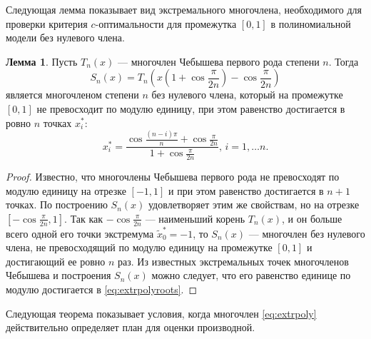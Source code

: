 \documentclass[specialist,
               substylefile = spbu.rtx,
               subf,href,colorlinks=true, 12pt]{disser}
\theoremstyle{definition}
\newtheorem{lemma}{Лемма}
\begin{document}
  Следующая лемма показывает вид экстремального многочлена, необходимого для проверки критерия $c$-оптимальности для промежутка $[0, 1]$ в полиномиальной модели без нулевого члена.
  
  \begin{lemma}
  \label{lemma:extrpoly}
  Пусть $T_n(x)$ --- многочлен Чебышева первого рода степени $n$. Тогда 
  	\begin{equation}
  	\label{eq:extrpoly}
  		S_n(x) = T_n \left(x \left(1 + \cos \frac{\pi}{2n} \right) - \cos \frac{\pi}{2n} \right)
	\end{equation}   
	является многочленом степени $n$ без нулевого члена, который на промежутке $[0, 1]$ не превосходит по модулю единицу, при этом равенство достигается в ровно $n$ точках $x^*_i$:
	\begin{equation}
	\label{eq:extrpolyroots}
		x_i^* = \frac{\cos \frac{(n - i) \pi}{n} + \cos \frac{\pi}{2n}}{1 + \cos \frac{\pi}{2n}} , \, i = 1, \ldots n.
	\end{equation}
  \end{lemma}
  
  \begin{proof}
  	Известно, что многочлены Чебышева первого рода не превосходят по модулю единицу на отрезке $[-1, 1]$ и при этом равенство достигается в $n+1$ точках. По построению $S_n(x)$ удовлетворяет этим же свойствам, но на отрезке $[-\cos \frac{\pi}{2 n}, 1]$. Так как $-\cos \frac{\pi}{2 n}$ --- наименьший корень $T_n(x)$, и он больше всего одной его точки экстремума $\tilde{x}_0^* = -1$, то $S_n(x)$ --- многочлен без нулевого члена, не превосходящий по модулю единицу на промежутке $[0, 1]$ и достигающий ее ровно $n$ раз. Из известных экстремальных точек многочленов Чебышева и построения $S_n(x)$ можно следует, что его равенство единице по модулю достигается в \eqref{eq:extrpolyroots}.
  \end{proof}
  
  Следующая теорема показывает условия, когда многочлен \eqref{eq:extrpoly} действительно определяет план для оценки производной. 
	
\end{document}
